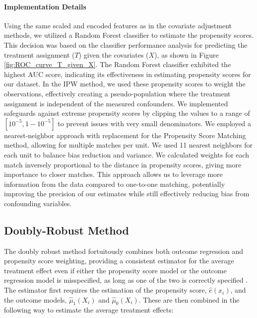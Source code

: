 \documentclass{article}
\begin{document}
\paragraph{Implementation Details} Using the same scaled and encoded features as in the covariate adjustment methods, we utilized a Random Forest classifier to estimate the propensity scores. This decision was based on the classifier performance analysis for predicting the treatment assignment (\(T\)) given the covariates (\(X\)), as shown in Figure \ref{fig:ROC_curve_T_given_X}. The Random Forest classifier exhibited the highest AUC score, indicating its effectiveness in estimating propensity scores for our dataset.
In the IPW method, we used these propensity scores to weight the observations, effectively creating a pseudo-population where the treatment assignment is independent of the measured confounders. We implemented safeguards against extreme propensity scores by clipping the values to a range of $[10^{-5}, 1-10^{-5}]$ to prevent issues with very small denominators.
We employed a nearest-neighbor approach with replacement for the Propensity Score Matching method, allowing for multiple matches per unit. We used 11 nearest neighbors for each unit to balance bias reduction and variance. We calculated weights for each match inversely proportional to the distance in propensity scores, giving more importance to closer matches. This approach allows us to leverage more information from the data compared to one-to-one matching, potentially improving the precision of our estimates while still effectively reducing bias from confounding variables.

\subsection{Doubly-Robust Method}

The doubly robust method fortuitously combines both outcome regression and propensity score weighting, providing a consistent estimator for the average treatment effect even if either the propensity score model or the outcome regression model is misspecified, as long as one of the two is correctly specified \citep{bang2005doubly}. The estimator first requires the estimation of the propensity score, $\hat{e}(x_i)$, and the outcome models, $\hat{\mu}_1(X_i)$ and $\hat{\mu}_0(X_i)$. These are then combined in the following way to estimate the average treatment effects:
\end{document}
